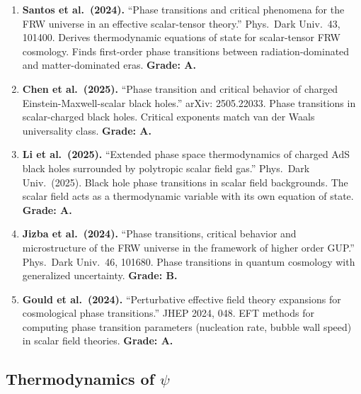 \documentclass[11pt,a4paper]{article}
\begin{document}
\begin{enumerate}
\item \textbf{Santos et al.\ (2024).} ``Phase transitions and critical phenomena for the FRW universe in an effective scalar-tensor theory.'' Phys.\ Dark Univ.\ 43, 101400. Derives thermodynamic equations of state for scalar-tensor FRW cosmology. Finds first-order phase transitions between radiation-dominated and matter-dominated eras. \textbf{Grade: A.}

\item \textbf{Chen et al.\ (2025).} ``Phase transition and critical behavior of charged Einstein-Maxwell-scalar black holes.'' arXiv: 2505.22033. Phase transitions in scalar-charged black holes. Critical exponents match van der Waals universality class. \textbf{Grade: A.}

\item \textbf{Li et al.\ (2025).} ``Extended phase space thermodynamics of charged AdS black holes surrounded by polytropic scalar field gas.'' Phys.\ Dark Univ.\ (2025). Black hole phase transitions in scalar field backgrounds. The scalar field acts as a thermodynamic variable with its own equation of state. \textbf{Grade: A.}

\item \textbf{Jizba et al.\ (2024).} ``Phase transitions, critical behavior and microstructure of the FRW universe in the framework of higher order GUP.'' Phys.\ Dark Univ.\ 46, 101680. Phase transitions in quantum cosmology with generalized uncertainty. \textbf{Grade: B.}

\item \textbf{Gould et al.\ (2024).} ``Perturbative effective field theory expansions for cosmological phase transitions.'' JHEP 2024, 048. EFT methods for computing phase transition parameters (nucleation rate, bubble wall speed) in scalar field theories. \textbf{Grade: A.}
\end{enumerate}

\subsection{Thermodynamics of $\psi$}
\end{document}
